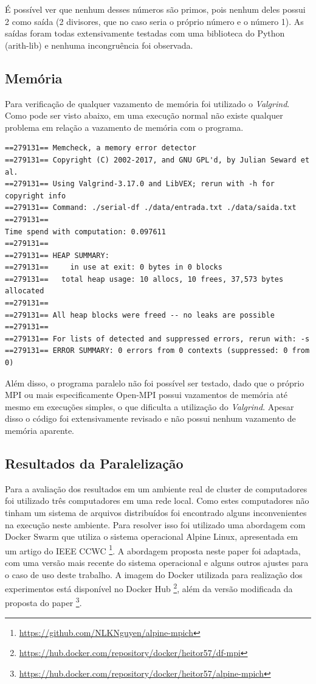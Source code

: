 \documentclass[12pt]{article}
\begin{document}
É possível ver que nenhum desses números são primos, pois nenhum deles possui 2 como saída (2 divisores, que no caso seria o próprio número e o número 1). As saídas foram todas extensivamente testadas com uma biblioteca do Python (arith-lib) e nenhuma incongruência foi observada.

\subsection{Memória}

Para verificação de qualquer vazamento de memória foi utilizado o \textit{Valgrind}. Como pode ser visto abaixo, em uma execução normal não existe qualquer problema em relação a vazamento de memória com o programa.

	{
		\scriptsize
		\begin{verbatim}
==279131== Memcheck, a memory error detector
==279131== Copyright (C) 2002-2017, and GNU GPL'd, by Julian Seward et al.
==279131== Using Valgrind-3.17.0 and LibVEX; rerun with -h for copyright info
==279131== Command: ./serial-df ./data/entrada.txt ./data/saida.txt
==279131== 
Time spend with computation: 0.097611
==279131== 
==279131== HEAP SUMMARY:
==279131==     in use at exit: 0 bytes in 0 blocks
==279131==   total heap usage: 10 allocs, 10 frees, 37,573 bytes allocated
==279131== 
==279131== All heap blocks were freed -- no leaks are possible
==279131== 
==279131== For lists of detected and suppressed errors, rerun with: -s
==279131== ERROR SUMMARY: 0 errors from 0 contexts (suppressed: 0 from 0)
\end{verbatim}
	}

Além disso, o programa paralelo não foi possível ser testado, dado que o próprio MPI ou mais especificamente Open-MPI possui vazamentos de memória até mesmo em execuções simples, o que dificulta a utilização do \textit{Valgrind}. Apesar disso o código foi extensivamente revisado e não possui nenhum vazamento de memória aparente.

\subsection{Resultados da Paralelização}

Para a avaliação dos resultados em um ambiente real de cluster de computadores foi utilizado três computadores em uma rede local. Como estes computadores não tinham um sistema de arquivos distribuídos foi encontrado alguns inconvenientes na execução neste ambiente. Para resolver isso foi utilizado uma abordagem com Docker Swarm que utiliza o sistema operacional Alpine Linux, apresentada em um artigo do IEEE CCWC \cite{nguyen2017distributed}\footnote{\url{https://github.com/NLKNguyen/alpine-mpich}}. A abordagem proposta neste paper foi adaptada, com uma versão mais recente do sistema operacional e alguns outros ajustes para o caso de uso deste trabalho. A imagem do Docker utilizada para realização dos experimentos está disponível no Docker Hub \footnote{\url{https://hub.docker.com/repository/docker/heitor57/df-mpi}}, além da versão modificada da proposta do paper \footnote{\url{https://hub.docker.com/repository/docker/heitor57/alpine-mpich}}.
\end{document}
